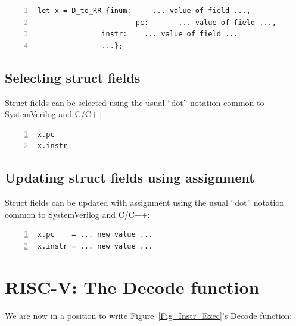 \begin{Verbatim}[frame=single, numbers=left]
      let x = D_to_RR {inum:     ... value of field ...,
                       pc:       ... value of field ...,
		       instr:    ... value of field ...
		       ...};
\end{Verbatim}


\subsection{Selecting struct fields}


Struct fields can be selected using the usual ``dot'' notation common
to SystemVerilog and C/C++:

\begin{Verbatim}[frame=single, numbers=left]
x.pc
x.instr
\end{Verbatim}



\subsection{Updating struct fields using assignment}


Struct fields can be updated with assignment using the usual ``dot''
notation common to SystemVerilog and C/C++:

\begin{Verbatim}[frame=single, numbers=left]
x.pc    = ... new value ...
x.instr = ... new value ...
\end{Verbatim}


\section{RISC-V: The Decode function}

\label{Sec_Combo_Decode}


We are now in a position to write Figure~\ref{Fig_Instr_Exec}'s Decode function:

